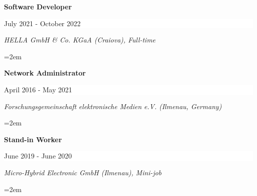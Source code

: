 \documentclass[paper=a4,fontsize=10.47pt]{scrartcl} %
\newcommand{\sepspace}{\vspace*{0.5em}}		%
\newcommand{\EducationEntry}[4]{
		\noindent \textbf{#1} \hfill      %
		\colorbox{White}{%
			\parbox{16em}{%
			\hfill\color{Black}#2}} \par  %
		\noindent \textit{#3} \par        %
		\noindent\hangindent=2em\hangafter=0 \small #4 %
		\normalsize \par}
\begin{document}
\EducationEntry{\color[HTML]{6a040f}Software Developer}{July 2021 - October 2022}{HELLA GmbH \& Co. KGaA (Craiova), Full-time}{%
%
%
}
\sepspace
\EducationEntry{\color[HTML]{6a040f}Network Administrator}{April 2016 - May 2021}{Forschungsgemeinschaft elektronische Medien e.V. (Ilmenau, Germany)}{}
\sepspace
\EducationEntry{\color[HTML]{6a040f}Stand-in Worker}{June 2019 - June 2020}{Micro-Hybrid Electronic GmbH (Ilmenau), Mini-job}{%
%
%	
}
 \sepspace
\end{document}
